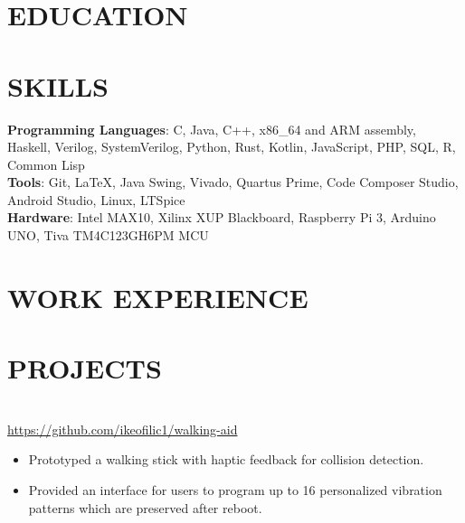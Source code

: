 \documentclass[10pt,letterpaper]{article}
\newcommand{\xspace}{0.3\baselineskip}
\begin{document}


\section*{EDUCATION}
    

\section*{SKILLS}
    \textbf{Programming Languages}: C, Java, C++, x86\_64 and ARM assembly, Haskell, Verilog, SystemVerilog, Python, Rust, Kotlin, JavaScript, PHP, SQL, R, Common Lisp \\
    \textbf{Tools}: Git, \LaTeX{}, Java Swing, Vivado, Quartus Prime, Code Composer Studio, Android Studio, Linux, LTSpice\\
    \textbf{Hardware}: Intel MAX10, Xilinx XUP Blackboard, Raspberry Pi 3, Arduino UNO, Tiva TM4C123GH6PM MCU

\section*{WORK EXPERIENCE}
    
    \vspace{0.2\baselineskip} %
    

\section*{PROJECTS}
    
    \vspace{\xspace}
    
    \vspace{\xspace}    

\\
{\url{https://github.com/ikeofilic1/walking-aid}}
\begin{itemize}
    \item Prototyped a walking stick with haptic feedback for collision detection.
    \item Provided an interface for users to program up to 16 personalized vibration patterns which are preserved after reboot.
\end{itemize}
\end{document}
